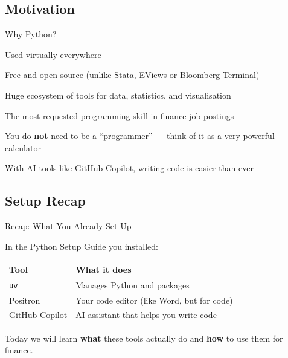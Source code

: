 \documentclass[9pt,aspectratio=169]{beamer}
\begin{document}
\subsection{Motivation}
\begin{frame}{Why Python?}

\bi
    \item Used virtually everywhere
    \item Free and open source (unlike Stata, EViews or Bloomberg Terminal)
    \item Huge ecosystem of tools for data, statistics, and visualisation
    \item The most-requested programming skill in finance job postings
    \item You do \textbf{not} need to be a ``programmer'' --- think of it as a very powerful calculator
    \item With AI tools like GitHub Copilot, writing code is easier than ever
\ei

\end{frame}


\subsection{Setup Recap}
\begin{frame}{Recap: What You Already Set Up}

In the \alert{Python Setup Guide} you installed:

\medskip

\begin{tabular}{@{}lp{10cm}@{}}
\toprule
\textbf{Tool} & \textbf{What it does} \\
\midrule
\texttt{uv} & Manages Python and packages \\[0.5em]
Positron & Your code editor (like Word, but for code) \\[0.5em]
GitHub Copilot & AI assistant that helps you write code \\
\bottomrule
\end{tabular}

\bigskip

\begin{highlightbox}
\centering
Today we will learn \textbf{what} these tools actually do and \textbf{how} to use them for finance.
\end{highlightbox}

\end{frame}


\end{document}
